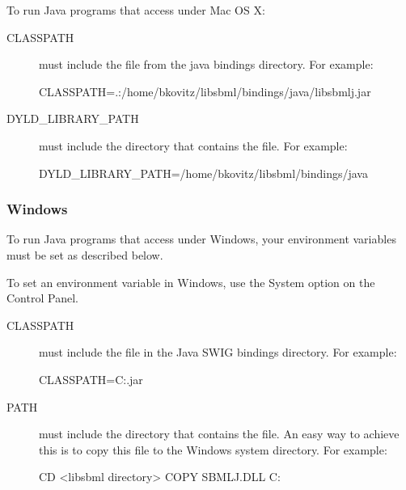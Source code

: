 \documentclass{sbmlmanual}
\begin{document}
To run Java programs that access \libsbml{} under Mac OS X:

\begin{description}

\item[CLASSPATH]
must include the  file from the \libsbml{}
java bindings directory.  For example:

\begin{shellVerbatim}
CLASSPATH=.:/home/bkovitz/libsbml/bindings/java/libsbmlj.jar
\end{shellVerbatim}

\item[DYLD\_LIBRARY\_PATH]
must include the directory that contains the
 file.  For example:

\begin{shellVerbatim}
DYLD_LIBRARY_PATH=/home/bkovitz/libsbml/bindings/java
\end{shellVerbatim}

\end{description}

\subsubsection{Windows}
\label{sec:java-windows-setup}

To run Java programs that access \libsbml{} under Windows, your environment
variables must be set as described below.

To set an environment variable in Windows, use the System option on the
Control Panel.

\begin{description}

\item[CLASSPATH]
must include the  file in the Java SWIG
bindings directory.  For example:

\begin{shellVerbatim}
CLASSPATH=C:\libsbml\bindings\java\sbmlj.jar
\end{shellVerbatim}

\item[PATH]
must include the directory that contains the  file. An
easy way to achieve this is to copy this file to the Windows system
directory. For example:

\begin{shellVerbatim}
CD <libsbml directory>
COPY SBMLJ.DLL C:\WINDOWS{}
\end{shellVerbatim}

\end{description}
\end{document}
